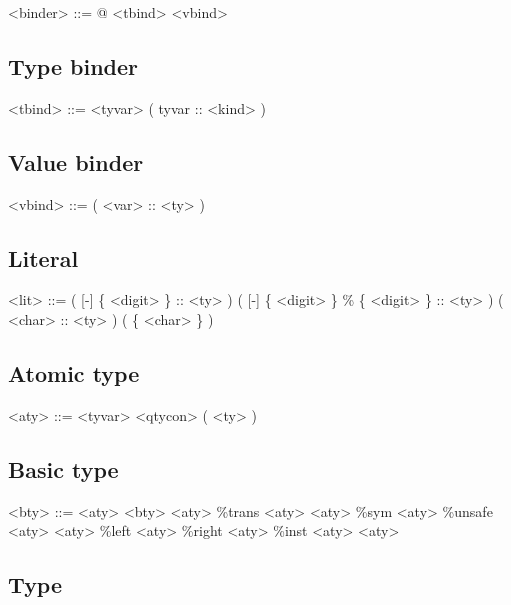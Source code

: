 \begin{grammar}
<binder> ::= @ <tbind>
        \alt <vbind>
\end{grammar}

\subsection*{Type binder}

\begin{grammar}
<tbind> ::= <tyvar>
       \alt ( tyvar :: <kind> )
\end{grammar}

\subsection*{Value binder}

\begin{grammar}
<vbind> ::= ( <var> :: <ty> )
\end{grammar}

\subsection*{Literal}

\begin{grammar}
<lit> ::= ( [-] \{ <digit> \} :: <ty> )
     \alt ( [-] \{ <digit> \} \% \{ <digit> \} :: <ty> )
     \alt ( <char> :: <ty> )
     \alt ( \{ <char> \} )
\end{grammar}

\subsection*{Atomic type}

\begin{grammar}
<aty> ::= <tyvar>
     \alt <qtycon>
     \alt ( <ty> )
\end{grammar}

\subsection*{Basic type}

\begin{grammar}
<bty> ::= <aty>
     \alt <bty> <aty>
     \alt \%trans <aty> <aty>
     \alt \%sym <aty>
     \alt \%unsafe <aty> <aty>
     \alt \%left <aty>
     \alt \%right <aty>
     \alt \%inst <aty> <aty>
\end{grammar}

\subsection*{Type}

